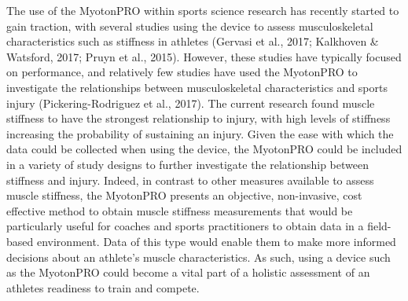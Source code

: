 \documentclass[man,floatsintext]{apa6}
\begin{document}
The use of the MyotonPRO within sports science research has recently started to gain traction, with several studies using the device to assess musculoskeletal characteristics such as stiffness in athletes (Gervasi et al., 2017; Kalkhoven \& Watsford, 2017; Pruyn et al., 2015).
However, these studies have typically focused on performance, and relatively few studies have used the MyotonPRO to investigate the relationships between musculoskeletal characteristics and sports injury (Pickering-Rodriguez et al., 2017).
The current research found muscle stiffness to have the strongest relationship to injury, with high levels of stiffness increasing the probability of sustaining an injury.
Given the ease with which the data could be collected when using the device, the MyotonPRO could be included in a variety of study designs to further investigate the relationship between stiffness and injury.
Indeed, in contrast to other measures available to assess muscle stiffness, the MyotonPRO presents an objective, non-invasive, cost effective method to obtain muscle stiffness measurements that would be particularly useful for coaches and sports practitioners to obtain data in a field-based environment.
Data of this type would enable them to make more informed decisions about an athlete's muscle characteristics.
As such, using a device such as the MyotonPRO could become a vital part of a holistic assessment of an athletes readiness to train and compete.
\end{document}
